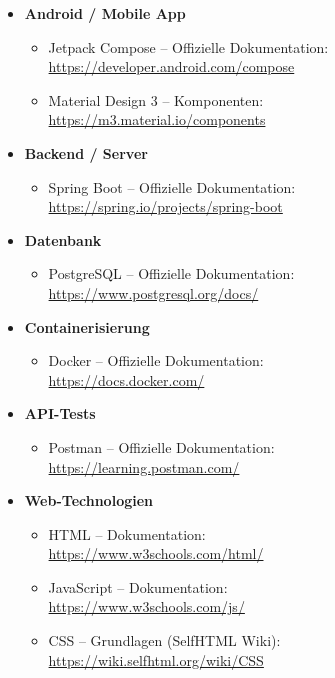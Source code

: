 \begin{itemize}

  \item \textbf{Android / Mobile App}
  \begin{itemize}
    \item Jetpack Compose – Offizielle Dokumentation: \\
    \url{https://developer.android.com/compose}
    \item Material Design 3 – Komponenten: \\
    \url{https://m3.material.io/components}
  \end{itemize}

  \item \textbf{Backend / Server}
  \begin{itemize}
    \item Spring Boot – Offizielle Dokumentation: \\
    \url{https://spring.io/projects/spring-boot}
  \end{itemize}

  \item \textbf{Datenbank}
  \begin{itemize}
    \item PostgreSQL – Offizielle Dokumentation: \\
    \url{https://www.postgresql.org/docs/}
  \end{itemize}

  \item \textbf{Containerisierung}
  \begin{itemize}
    \item Docker – Offizielle Dokumentation: \\
    \url{https://docs.docker.com/}
  \end{itemize}

  \item \textbf{API-Tests}
  \begin{itemize}
    \item Postman – Offizielle Dokumentation: \\
    \url{https://learning.postman.com/}
  \end{itemize}

  \item \textbf{Web-Technologien}
  \begin{itemize}
    \item HTML – Dokumentation: \\
    \url{https://www.w3schools.com/html/}
    \item JavaScript – Dokumentation: \\
    \url{https://www.w3schools.com/js/}
    \item CSS – Grundlagen (SelfHTML Wiki): \\
    \url{https://wiki.selfhtml.org/wiki/CSS}
  \end{itemize}

\end{itemize}

